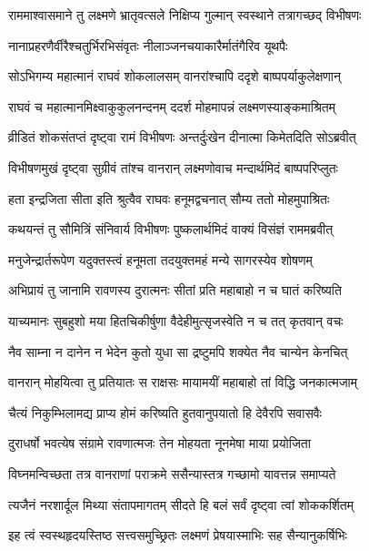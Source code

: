 
\twolineshloka
{राममाश्वासमाने तु लक्ष्मणे भ्रातृवत्सले}
{निक्षिप्य गुल्मान् स्वस्थाने तत्रागच्छद् विभीषणः} %

\twolineshloka
{नानाप्रहरणैर्वीरैश्चतुर्भिरभिसंवृतः}
{नीलाञ्जनचयाकारैर्मातंगैरिव यूथपैः} %

\twolineshloka
{सोऽभिगम्य महात्मानं राघवं शोकलालसम्}
{वानरांश्चापि ददृशे बाष्पपर्याकुलेक्षणान्} %

\twolineshloka
{राघवं च महात्मानमिक्ष्वाकुकुलनन्दनम्}
{ददर्श मोहमापन्नं लक्ष्मणस्याङ्कमाश्रितम्} %

\twolineshloka
{व्रीडितं शोकसंतप्तं दृष्ट्वा रामं विभीषणः}
{अन्तर्दुःखेन दीनात्मा किमेतदिति सोऽब्रवीत्} %

\twolineshloka
{विभीषणमुखं दृष्ट्वा सुग्रीवं तांश्च वानरान्}
{लक्ष्मणोवाच मन्दार्थमिदं बाष्पपरिप्लुतः} %

\twolineshloka
{हता इन्द्रजिता सीता इति श्रुत्वैव राघवः}
{हनूमद्वचनात् सौम्य ततो मोहमुपाश्रितः} %

\twolineshloka
{कथयन्तं तु सौमित्रिं संनिवार्य विभीषणः}
{पुष्कलार्थमिदं वाक्यं विसंज्ञं राममब्रवीत्} %

\twolineshloka
{मनुजेन्द्रार्तरूपेण यदुक्तस्त्वं हनूमता}
{तदयुक्तमहं मन्ये सागरस्येव शोषणम्} %

\twolineshloka
{अभिप्रायं तु जानामि रावणस्य दुरात्मनः}
{सीतां प्रति महाबाहो न च घातं करिष्यति} %

\twolineshloka
{याच्यमानः सुबहुशो मया हितचिकीर्षुणा}
{वैदेहीमुत्सृजस्वेति न च तत् कृतवान् वचः} %

\twolineshloka
{नैव साम्ना न दानेन न भेदेन कुतो युधा}
{सा द्रष्टुमपि शक्येत नैव चान्येन केनचित्} %

\twolineshloka
{वानरान् मोहयित्वा तु प्रतियातः स राक्षसः}
{मायामयीं महाबाहो तां विद्धि जनकात्मजाम्} %

\twolineshloka
{चैत्यं निकुम्भिलामद्य प्राप्य होमं करिष्यति}
{हुतवानुपयातो हि देवैरपि सवासवैः} %

\twolineshloka
{दुराधर्षो भवत्येष संग्रामे रावणात्मजः}
{तेन मोहयता नूनमेषा माया प्रयोजिता} %

\twolineshloka
{विघ्नमन्विच्छता तत्र वानराणां पराक्रमे}
{ससैन्यास्तत्र गच्छामो यावत्तन्न समाप्यते} %

\twolineshloka
{त्यजैनं नरशार्दूल मिथ्या संतापमागतम्}
{सीदते हि बलं सर्वं दृष्ट्वा त्वां शोककर्शितम्} %

\twolineshloka
{इह त्वं स्वस्थहृदयस्तिष्ठ सत्त्वसमुच्छ्रितः}
{लक्ष्मणं प्रेषयास्माभिः सह सैन्यानुकर्षिभिः} %

